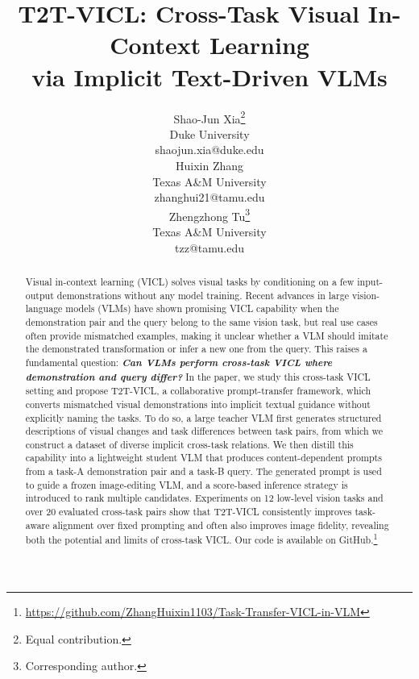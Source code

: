 \documentclass[11pt]{article}
\title{T2T-VICL: Cross-Task Visual In-Context Learning \\via Implicit Text-Driven VLMs}
\author{
Shao-Jun Xia\thanks{Equal contribution.}\\
Duke University\\
{\texttt\small shaojun.xia@duke.edu}
\\\And
Huixin Zhang\footnotemark[1]\\
Texas A\&M University\\
{\texttt\small zhanghui21@tamu.edu}
\\\And
Zhengzhong Tu\thanks{Corresponding author.}\\
Texas A\&M University\\
{\texttt\small tzz@tamu.edu}
}
\begin{document}
\maketitle
\begin{abstract}
Visual in-context learning (VICL) solves visual tasks by conditioning on a few input-output demonstrations without any model training.
Recent advances in large vision-language models (VLMs) have shown promising VICL capability when the demonstration pair and the query belong to the same vision task, but real use cases often provide mismatched examples, making it unclear whether a VLM should imitate the demonstrated transformation or infer a new one from the query.
This raises a fundamental question:
\textbf{\textit{Can VLMs perform cross-task VICL where demonstration and query differ?}} %
In the paper, we study this cross-task VICL setting and propose T2T-VICL, a collaborative prompt-transfer framework, which converts mismatched visual demonstrations into implicit textual guidance without explicitly naming the tasks.
To do so, a large teacher VLM first generates structured descriptions of visual changes and task differences between task pairs, from which we construct a dataset of diverse implicit cross-task relations. We then distill this capability into a lightweight student VLM that produces content-dependent prompts from a task-A demonstration pair and a task-B query. The generated prompt is used to guide a frozen image-editing VLM, and a score-based inference strategy is introduced to rank multiple candidates.
Experiments on 12 low-level vision tasks and over 20 evaluated cross-task pairs show that T2T-VICL consistently improves task-aware alignment over fixed prompting and often also improves image fidelity, revealing both the potential and limits of cross-task VICL. Our code is available on GitHub.\footnote{\url{https://github.com/ZhangHuixin1103/Task-Transfer-VICL-in-VLM}}
\end{abstract}
\end{document}

